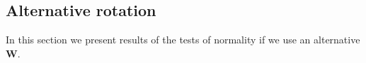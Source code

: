\documentclass[12pt]{article} %
\begin{document}


\subsection{Alternative rotation}\label{supp:simstudy-alt}

In this section we present results of the tests of normality if we use an alternative $\bm{W}$.


\end{document}
